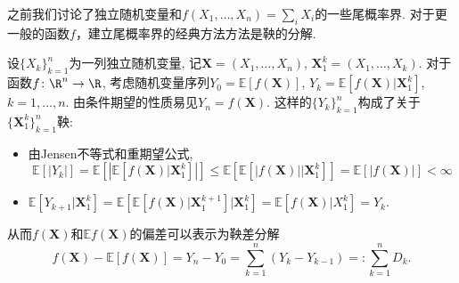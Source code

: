 之前我们讨论了独立随机变量和$f(X_1, \dots, X_n) = \sum_i X_i$的一些尾概率界. 对于更一般的函数$f$，建立尾概率界的经典方法方法是鞅的分解. 

设$\{X_k\}_{k=1}^n$为一列独立随机变量, 记$\bm X = (X_1, \dots, X_n)$, $\bm X_1^k = (X_1, \dots, X_k)$. 
对于函数$f \colon \R^n \to \R$, 考虑随机变量序列$Y_0 = \mathbb{E}[f(\bm X)]$, $Y_k = \mathbb{E}[f(\bm X)|\bm X_1^k]$, $k = 1, \dots, n$. 
由条件期望的性质易见$Y_n = f(\bm X)$. 
这样的$\{Y_k\}_{k=1}^n$构成了关于$\{\bm X_1^k\}_{k=1}^n$鞅: 
\begin{itemize}
	\item 由Jensen不等式和重期望公式, 
		\begin{equation*}
			\mathbb{E}[|Y_k|]
			= \mathbb{E}\left[\left|\mathbb{E}[f(\bm X)|\bm X_1^k]\right|\right] 
			\leq \mathbb{E}\left[\mathbb{E}[|f(\bm X)||\bm X_1^k] \right]
			= \mathbb{E}[|f(\bm X)|]
			< \infty
		\end{equation*}
	\item $\mathbb{E}[Y_{k+1}|\bm X_1^k] = \mathbb{E}\left[\mathbb{E}[f(\bm X)|\bm X_1^{k+1}] \big|\bm X_1^k\right] = \mathbb{E}[f(\bm X) | X_1^k] = Y_k$. 
\end{itemize}
从而$f(\bm X)$和$\mathbb{E}f(\bm X)$的偏差可以表示为鞅差分解
\begin{equation*}
	f(\bm X) - \mathbb{E}[f(\bm X)] 
	= Y_n - Y_0 
	= \sum_{k=1}^n (Y_k - Y_{k-1})
	=: \sum_{k=1}^n D_k.
\end{equation*}

